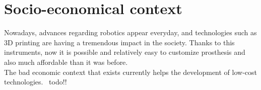 \chapter*{Socio-economical context}

Nowadays, advances regarding robotics appear everyday, and technologies such as 3D printing are having a tremendous impact in the society. Thanks to this instruments, now it is possible and relatively easy to customize prosthesis and also much affordable than it was before. 
\\

The bad economic context that exists currently helps the development of low-cost technologies. 
\ todo!! 

